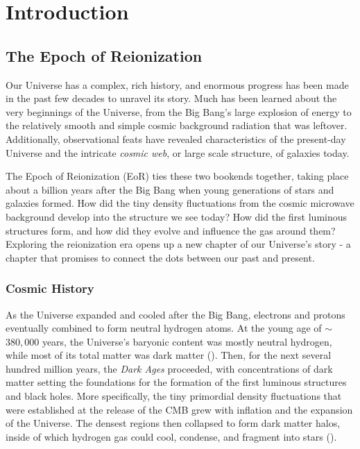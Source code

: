 \chapter{Introduction}
\label{c.intro}

\section{The Epoch of Reionization}

Our Universe has a complex, rich history, and enormous progress has been made in the past few decades to unravel its story. Much has been learned about the very beginnings of the Universe, from the Big Bang's large explosion of energy to the relatively smooth and simple cosmic background radiation that was leftover. Additionally, observational feats have revealed characteristics of the present-day Universe and the intricate \textit{cosmic web}, or large scale structure, of galaxies today. 

The Epoch of Reionization (EoR) ties these two bookends together, taking place about a billion years after the Big Bang when young generations of stars and galaxies formed. How did the tiny density fluctuations from the cosmic microwave background develop into the structure we see today? How did the first luminous structures form, and how did they evolve and influence the gas around them? Exploring the reionization era opens up a new chapter of our Universe's story - a chapter that promises to connect the dots between our past and present.

\subsection{Cosmic History}

As the Universe expanded and cooled after the Big Bang, electrons and protons eventually combined to form neutral hydrogen atoms. At the young age of $\sim$ $380,000$ years, the Universe's baryonic content was mostly neutral hydrogen, while most of its total matter was dark matter (\citealt{loeb_furlanetto_2013}). Then, for the next several hundred million years, the \textit{Dark Ages} proceeded, with concentrations of dark matter setting the foundations for the formation of the first luminous structures and black holes. More specifically, the tiny primordial density fluctuations that were established at the release of the CMB grew with inflation and the expansion of the Universe. The densest regions then collapsed to form dark matter halos, inside of which hydrogen gas could cool, condense, and fragment into stars (\citealt{dodelson_cosmology}).

